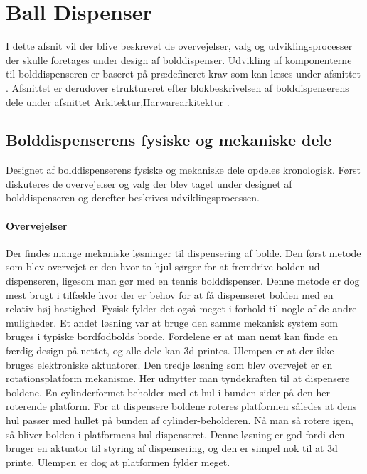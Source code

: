 \documentclass[Rapport/Rapport_main.tex]{subfiles}
\begin{document}
\section{Ball Dispenser}
I dette afsnit vil der blive beskrevet de overvejelser, valg og udviklingsprocesser der skulle foretages under design af bolddispenser. Udvikling af komponenterne til bolddispenseren er baseret på prædefineret krav som kan læses under afsnittet . Afsnittet er derudover struktureret efter blokbeskrivelsen af bolddispenserens dele under afsnittet Arkitektur,Harwarearkitektur .

\subsection{Bolddispenserens fysiske og mekaniske dele}
Designet af bolddispenserens fysiske og mekaniske dele opdeles kronologisk. Først diskuteres de overvejelser og valg der blev taget under designet af bolddispenseren og derefter beskrives udviklingsprocessen.

\paragraph{Overvejelser}
\newline\newline
Der findes mange mekaniske løsninger til dispensering af bolde. Den først metode som blev overvejet er den hvor to hjul sørger for at fremdrive bolden ud dispenseren, ligesom man gør med en tennis bolddispenser. Denne metode er dog mest brugt i tilfælde hvor der er behov for at få dispenseret bolden med en relativ høj hastighed. Fysisk fylder det også meget i forhold til nogle af de andre muligheder. Et andet løsning var at bruge den samme mekanisk system som bruges i typiske bordfodbolds borde. Fordelene er at man nemt kan finde en færdig design på nettet, og alle dele kan 3d printes. Ulempen er at der ikke bruges elektroniske aktuatorer.
Den tredje løsning som blev overvejet er en rotationsplatform mekanisme. Her udnytter man tyndekraften til at dispensere boldene. En cylinderformet beholder med et hul i bunden sider på den her roterende platform. For at dispensere boldene roteres platformen således at dens hul passer med hullet på bunden af cylinder-beholderen. Nå man så rotere igen, så bliver bolden i platformens hul dispenseret. Denne løsning er god fordi den bruger en aktuator til styring af dispensering, og den er simpel nok til at 3d printe. Ulempen er dog at platformen fylder meget.
\end{document}
